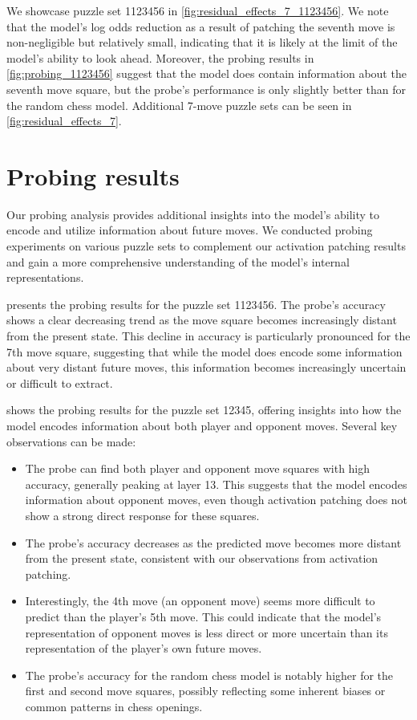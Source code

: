 \documentclass{article}
\begin{document}
We showcase puzzle set 1123456 in \cref{fig:residual_effects_7_1123456}. We note that the model's log odds reduction as a result of patching the seventh move is non-negligible but relatively small, indicating that it is likely at the limit of the model's ability to look ahead. Moreover, the probing results in \cref{fig:probing_1123456} suggest that the model does contain information about the seventh move square, but the probe's performance is only slightly better than for the random chess model. Additional 7-move puzzle sets can be seen in \cref{fig:residual_effects_7}.

\clearpage
\section{Probing results}\label{sec:probing_effects_extra}

Our probing analysis provides additional insights into the model's ability to encode and utilize information about future moves. We conducted probing experiments on various puzzle sets to complement our activation patching results and gain a more comprehensive understanding of the model's internal representations.

 presents the probing results for the puzzle set 1123456. The probe's accuracy shows a clear decreasing trend as the move square becomes increasingly distant from the present state. This decline in accuracy is particularly pronounced for the 7th move square, suggesting that while the model does encode some information about very distant future moves, this information becomes increasingly uncertain or difficult to extract.

 shows the probing results for the puzzle set 12345, offering insights into how the model encodes information about both player and opponent moves. Several key observations can be made:
\begin{itemize}
  \item The probe can find both player and opponent move squares with high accuracy, generally peaking at layer 13. This suggests that the model encodes information about opponent moves, even though activation patching does not show a strong direct response for these squares.
  \item The probe's accuracy decreases as the predicted move becomes more distant from the present state, consistent with our observations from activation patching.
  \item Interestingly, the 4th move (an opponent move) seems more difficult to predict than the player's 5th move. This could indicate that the model's representation of opponent moves is less direct or more uncertain than its representation of the player's own future moves.
  \item The probe's accuracy for the random chess model is notably higher for the first and second move squares, possibly reflecting some inherent biases or common patterns in chess openings.
\end{itemize}
\end{document}
